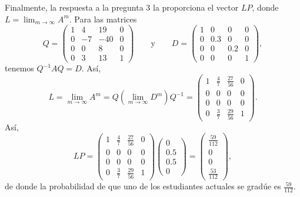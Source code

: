 \documentclass[12pt,a4paper]{book}
\begin{document}
    Finalmente, la respuesta a la pregunta 3 la proporciona el vector $LP$, donde $L=\lim_{m\to\infty}A^m$. Para las matrices
    \begin{equation*}
        Q=\begin{pmatrix}1&4&19&0\\0&-7&-40&0\\0&0&8&0\\0&3&13&1\end{pmatrix} \qquad\text{y}\qquad D=\begin{pmatrix}1&0&0&0\\0&0.3&0&0\\0&0&0.2&0\\0&0&0&1\end{pmatrix},
    \end{equation*}
    tenemos $Q^{-1}AQ=D$. Así,
    \begin{equation*}
        L=\lim_{m\to\infty}A^m=Q\left(\lim_{m\to\infty}D^m\right)Q^{-1}=\begin{pmatrix}1&\frac47&\frac{27}{56}&0\\0&0&0&0\\0&0&0&0\\0&\frac37&\frac{29}{56}&1\end{pmatrix}.
    \end{equation*}
    Así,
    \begin{equation*}
        LP=\begin{pmatrix}1&\frac47&\frac{27}{56}&0\\0&0&0&0\\0&0&0&0\\0&\frac37&\frac{29}{56}&1\end{pmatrix}\begin{pmatrix}0\\0.5\\0.5\\0\end{pmatrix}=\begin{pmatrix}\frac{59}{112}\\0\\0\\\frac{53}{112}\end{pmatrix},
    \end{equation*}
    de donde la probabilidad de que uno de los estudiantes actuales se gradúe es $\frac{59}{112}$.
\end{document}
